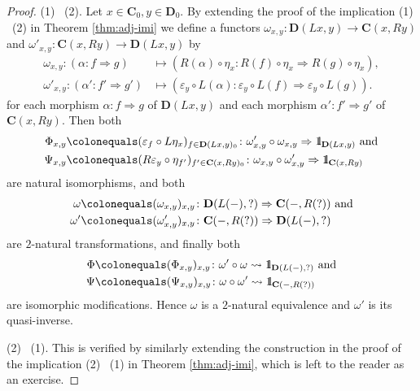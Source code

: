 \documentclass{surv-l}
\numberwithin{equation}{chapter}
\numberwithin{figure}{chapter}
\theoremstyle{plain}
\theoremstyle{definition}
\theoremstyle{remark}
\newcommand{\id}{1\kern-.25em{\text{{\rm l}}}}
\DeclareMathOperator{\blank}{-}
\begin{document}
\begin{proof}
(1) \text{$\Rightarrow$}\  (2).
Let $x \in \mathbf{C}_0, y \in \mathbf{D}_0$.
By extending
the proof of the implication (1) \text{$\Rightarrow$}\  (2) in
Theorem \ref{thm:adj-imi} we define a functors
$\omega_{x,y} \colon \mathbf{D}(Lx, y) \to \mathbf{C}(x, Ry)$ and
$\omega'_{x,y} \colon \mathbf{C}(x, Ry) \to \mathbf{D}(Lx, y)$ by
\begin{equation*}
\begin{aligned}
\omega_{x,y}\colon (\alpha \colon f \Rightarrow g) &\mapsto (R(\alpha) \circ \eta_x \colon R(f)\circ \eta_x \Rightarrow R(g) \circ \eta_x),\\
\omega'_{x,y}\colon (\alpha' \colon f' \Rightarrow g') &\mapsto (\varepsilon_y\circ L(\alpha) \colon \varepsilon_y \circ L(f) \Rightarrow \varepsilon_y\circ L(g)).
\end{aligned}
\end{equation*}
for each morphism $\alpha \colon f \Rightarrow g$ of $\mathbf{D}(Lx, y)$ and
each morphism $\alpha' \colon f' \Rightarrow g'$ of $\mathbf{C}(x, Ry)$.
Then both
\begin{equation*}
\begin{aligned}
\Phi_{x,y}&\colonequals (\varepsilon_f\circ L\eta_x)_{f \in \mathbf{D}(Lx, y)_0} \colon \omega'_{x,y}\circ \omega_{x,y} \Rightarrow \id_{\mathbf{D}(Lx, y)} \text{ and}\\
\Psi_{x,y}&\colonequals  (R\varepsilon_y \circ \eta_{f'})_{f' \in \mathbf{C}(x, Ry)_0} \colon \omega_{x,y} \circ \omega'_{x,y} \Rightarrow \id_{\mathbf{C}(x, Ry)}
\end{aligned}
\end{equation*}
are natural isomorphisms, and both
\begin{equation*}
\begin{aligned}
\omega&\colonequals  (\omega_{x,y})_{x,y}\colon \mathbf{D}(L(\blank), ?) \Rightarrow \mathbf{C}(\blank, R(?))\text{ and}\\
\omega'&\colonequals  (\omega'_{x,y})_{x,y} \colon \mathbf{C}(\blank, R(?)) \Rightarrow \mathbf{D}(L(\blank), ?)
\end{aligned}
\end{equation*}
are $2$-natural transformations, and finally both
\begin{equation*}
\begin{aligned}
\Phi&\colonequals  (\Phi_{x,y})_{x,y} \colon \omega' \circ \omega \leadsto  \id_{\mathbf{D}(L(\blank), ?)}\text{ and}\\
\Psi&\colonequals (\Psi_{x,y})_{x,y} \colon \omega \circ \omega' \leadsto \id_{\mathbf{C}(\blank, R(?))}
\end{aligned}
\end{equation*}
are isomorphic modifications.
Hence $\omega$ is a $2$-natural equivalence and $\omega'$
is its quasi-inverse.

(2) \text{$\Rightarrow$}\  (1).
This is verified by similarly extending the construction in the proof of the implication
(2) \text{$\Rightarrow$}\  (1) in Theorem \ref{thm:adj-imi}, which is left to the reader as an exercise.
\end{proof}
\end{document}
